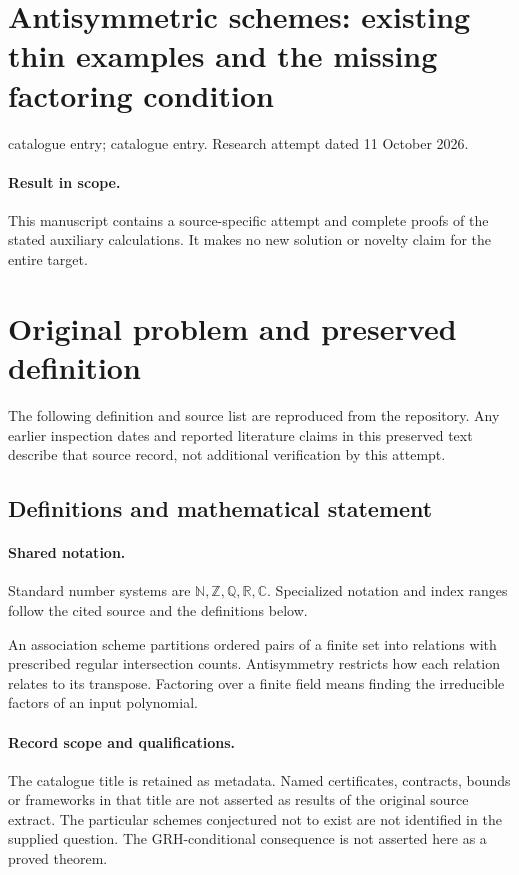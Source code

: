 \documentclass[11pt]{article}
\begin{document}
\section*{Antisymmetric schemes: existing thin examples and the missing factoring condition}
\noindent catalogue entry; catalogue entry. Research attempt dated 11 October 2026.
\paragraph{Result in scope.}This manuscript contains a source-specific attempt and complete proofs of the stated auxiliary calculations. It makes no new solution or novelty claim for the entire target.
\section{Original problem and preserved definition}
The following definition and source list are reproduced from the repository. Any earlier inspection dates and reported literature claims in this preserved text describe that source record, not additional verification by this attempt.
\subsection{Definitions and mathematical statement}

\paragraph{Shared notation.}Standard number systems are $\mathbb N,\mathbb Z,\mathbb Q,\mathbb R,\mathbb C$. Specialized notation and index ranges follow the cited source and the definitions below.


An association scheme partitions ordered pairs of a finite set into relations with prescribed regular intersection counts. Antisymmetry restricts how each relation relates to its transpose. Factoring over a finite field means finding the irreducible factors of an input polynomial.
\paragraph{Record scope and qualifications.}
The catalogue title is retained as metadata. Named certificates, contracts, bounds or frameworks in that title are not asserted as results of the original source extract.
The particular schemes conjectured not to exist are not identified in the supplied question. The GRH-conditional consequence is not asserted here as a proved theorem.
\end{document}
